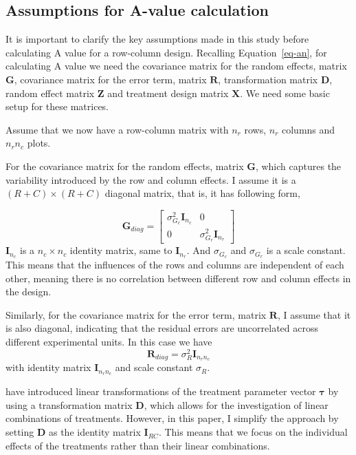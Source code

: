 \documentclass[
  a4paper,
  oneside,
  openany,
  12pt,
  onecolumn]{book}
\theoremstyle{definition}
\theoremstyle{plain}
\theoremstyle{remark}
\begin{document}
\subsection{Assumptions for A-value
calculation}\label{assumptions-for-a-value-calculation}

It is important to clarify the key assumptions made in this study before
calculating A value for a row-column design. Recalling
Equation~\ref{eq-an}, for calculating A value we need the covariance
matrix for the random effects, matrix \(\boldsymbol{G}\), covariance
matrix for the error term, matrix \(\boldsymbol{R}\), transformation
matrix \(\boldsymbol{D}\), random effect matrix \(\boldsymbol{Z}\) and
treatment design matrix \(\boldsymbol{X}\). We need some basic setup for
these matrices.

Assume that we now have a row-column matrix with \(n_r\) rows, \(n_r\)
columns and \(n_rn_c\) plots.

For the covariance matrix for the random effects, matrix
\(\boldsymbol{G}\), which captures the variability introduced by the row
and column effects. I assume it is a \((R+C)\times(R+C)\) diagonal
matrix, that is, it has following form,

\[
\boldsymbol{G}_{diag} =
\begin{bmatrix}
\sigma_{G_c}^2\boldsymbol{I}_{n_c} & 0 \\
0 & \sigma_{G_r}^2\boldsymbol{I}_{n_r}
\end{bmatrix}
\] \(\boldsymbol{I}_{n_c}\) is a \({n_c}\times{n_c}\) identity matrix,
same to \(\boldsymbol{I}_{n_r}\). And \(\sigma_{G_c}\) and
\(\sigma_{G_r}\) is a scale constant. This means that the influences of
the rows and columns are independent of each other, meaning there is no
correlation between different row and column effects in the design.

Similarly, for the covariance matrix for the error term, matrix
\(\boldsymbol{R}\), I assume that it is also diagonal, indicating that
the residual errors are uncorrelated across different experimental
units. In this case we have \[
\boldsymbol{R}_{diag} = \sigma_{R}^2\boldsymbol{I}_{n_rn_c}
\] with identity matrix \(\boldsymbol{I}_{n_rn_c}\) and scale constant
\(\sigma_{R}\).

\citet{butler2013optimal} have introduced linear transformations of the
treatment parameter vector \(\boldsymbol{\tau}\) by using a
transformation matrix \(\boldsymbol{D}\), which allows for the
investigation of linear combinations of treatments. However, in this
paper, I simplify the approach by setting \(\boldsymbol{D}\) as the
identity matrix \(\boldsymbol{I}_{RC}\). This means that we focus on the
individual effects of the treatments rather than their linear
combinations.
\end{document}
